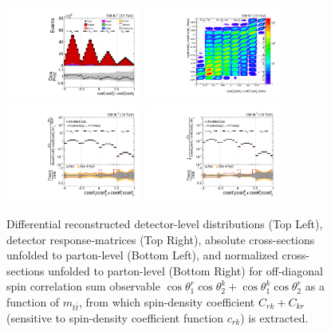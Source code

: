 \clearpage
\begin{figure}[htb]
\begin{center}
 \includegraphics[width=0.40\textwidth]{fig_fullRun2UL/controlplots/combined/Hyp_LLBarCPrk_vs_TTBarMass.pdf}
 \includegraphics[width=0.40\textwidth]{fig_fullRun2UL/unfolding/combined/ResponseMatrix_c_Prk_mttbar.pdf} \\
 \includegraphics[width=0.40\textwidth]{fig_fullRun2UL/unfolding/combined/UnfoldedResults_c_Prk_mttbar.pdf}
 \includegraphics[width=0.40\textwidth]{fig_fullRun2UL/unfolding/combined/UnfoldedResultsNorm_c_Prk_mttbar.pdf} \\
\label{fig:c_Prk_mttbar}
\caption{Differential reconstructed detector-level distributions (Top Left), detector response-matrices (Top Right), absolute cross-sections unfolded to parton-level (Bottom Left), and normalized cross-sections unfolded to parton-level (Bottom Right) for off-diagonal spin correlation sum observable $\cos\theta_{1}^{r}\cos\theta_{2}^{k}+\cos\theta_{1}^{k}\cos\theta_{2}^{r}$ as a function of $m_{t\bar{t}}$, from which spin-density coefficient $C_{rk}+C_{kr}$ (sensitive to spin-density coefficient function $c_{r k}$) is extracted.}
\end{center}
\end{figure}
